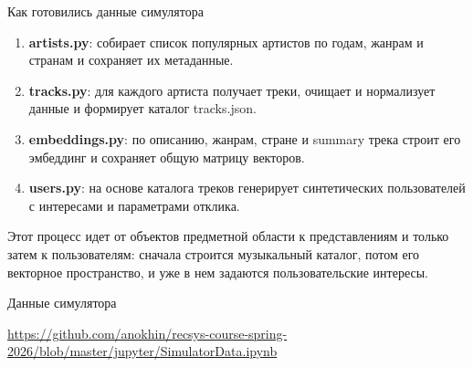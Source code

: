 \documentclass[11pt,aspectratio=169,handout]{beamer}
\newcommand{\code}[1]{\textsf{#1}}
\begin{document}
\begin{frame}{Как готовились данные симулятора}

\begin{tcolorbox}[colback=info!5,colframe=info!80,title=Генерация задачи с помощью LM]
\footnotesize
\begin{enumerate}
\item \textbf{\code{artists.py}}: собирает список популярных артистов по годам, жанрам и странам и сохраняет их метаданные.
\item \textbf{\code{tracks.py}}: для каждого артиста получает треки, очищает и нормализует данные и формирует каталог \code{tracks.json}.
\item \textbf{\code{embeddings.py}}: по описанию, жанрам, стране и summary трека строит его эмбеддинг и сохраняет общую матрицу векторов.
\item \textbf{\code{users.py}}: на основе каталога треков генерирует синтетических пользователей с интересами и параметрами отклика.
\end{enumerate}
\end{tcolorbox}

\vspace{0.15cm}
\footnotesize
Этот процесс идет от объектов предметной области к представлениям и только затем к пользователям: сначала строится музыкальный каталог, потом его векторное пространство, и уже в нем задаются пользовательские интересы.

\end{frame}

\begin{frame}[shrink=3]{Данные симулятора}

\vspace{3em}
\url{https://github.com/anokhin/recsys-course-spring-2026/blob/master/jupyter/SimulatorData.ipynb}

\end{frame}
\end{document}
